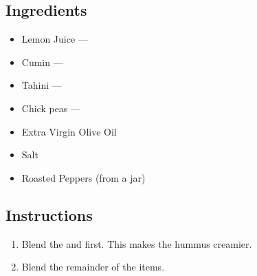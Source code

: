 \documentclass[12pt]{article}%
\begin{document}
\recipetitle

\subsection*{Ingredients}

\begin{itemize}[nolistsep]
    \item Lemon Juice --- 
    \item Cumin --- 
    \item Tahini --- 
    \item Chick peas --- 
    \item Extra Virgin Olive Oil
    \item Salt
    \item Roasted Peppers (from a jar)
\end{itemize}

\subsection*{Instructions}

\begin{enumerate}
    \item Blend the  and  first. This makes the hummus creamier.
    \item Blend the remainder of the items.
\end{enumerate}
\end{document}
